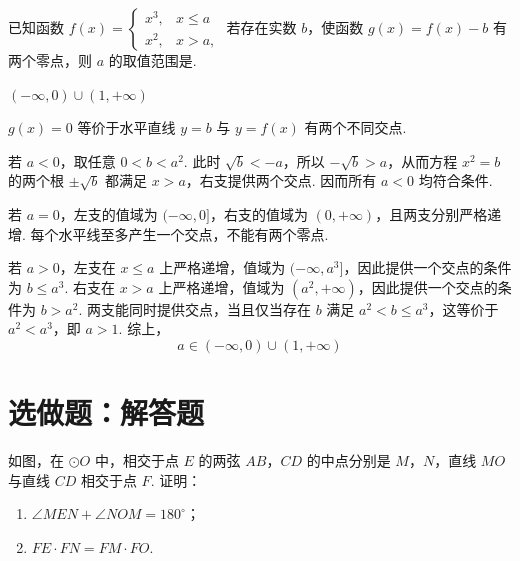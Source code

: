 \begin{problem}
已知函数 \( f(x) = \begin{cases}
x^3, & x \leqslant a\\
x^2, & x > a,
\end{cases} \) 若存在实数 \( b \)，使函数 \( g(x) = f(x) - b \) 有两个零点，则 \( a \) 的取值范围是\fillinblank{}.
\end{problem}

\begin{answer}
\((-\infty,0)\cup(1,+\infty)\)
\end{answer}

\begin{solution}
\(g(x)=0\) 等价于水平直线 \(y=b\) 与 \(y=f(x)\) 有两个不同交点.

若 \(a<0\)，取任意 \(0<b<a^2\). 此时 \(\sqrt b<-a\)，所以 \(-\sqrt b>a\)，从而方程 \(x^2=b\) 的两个根 \(\pm\sqrt b\) 都满足 \(x>a\)，右支提供两个交点. 因而所有 \(a<0\) 均符合条件.

若 \(a=0\)，左支的值域为 \((-\infty,0]\)，右支的值域为 \((0,+\infty)\)，且两支分别严格递增. 每个水平线至多产生一个交点，不能有两个零点.

若 \(a>0\)，左支在 \(x\leqslant a\) 上严格递增，值域为 \((-\infty,a^3]\)，因此提供一个交点的条件为 \(b\leqslant a^3\). 右支在 \(x>a\) 上严格递增，值域为 \((a^2,+\infty)\)，因此提供一个交点的条件为 \(b>a^2\). 两支能同时提供交点，当且仅当存在 \(b\) 满足 \(a^2<b\leqslant a^3\)，这等价于 \(a^2<a^3\)，即 \(a>1\). 综上，
\[
a\in(-\infty,0)\cup(1,+\infty)
\]
\end{solution}

\section{选做题：解答题}

\begin{problem}[I]
如图，在 \(\odot O\) 中，相交于点 \(E\) 的两弦 \(AB\)，\(CD\) 的中点分别是 \(M\)，\(N\)，直线 \(MO\) 与直线 \(CD\) 相交于点 \(F\). 证明：

\begin{enumerate}
\item \(\angle MEN + \angle NOM = 180^{\circ}\)；
\item \(FE\cdot FN = FM\cdot FO\).
\end{enumerate}

\end{problem}

